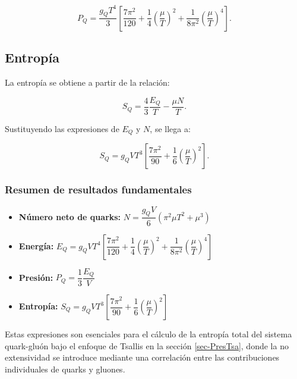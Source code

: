 \begin{equation}
P_Q = \frac{g_Q T^4}{3} \left[ \frac{7\pi^2}{120} + \frac{1}{4} \left( \frac{\mu}{T} \right)^2 + \frac{1}{8\pi^2} \left( \frac{\mu}{T} \right)^4 \right].
\end{equation}


\subsection{Entropía}

La entropía se obtiene a partir de la relación:

\begin{equation}
S_Q = \frac{4}{3} \frac{E_Q}{T} - \frac{\mu N}{T}.
\end{equation}

Sustituyendo las expresiones de \( E_Q \) y \( N \), se llega a:

\begin{equation}
S_Q = g_Q V T^3 \left[ \frac{7\pi^2}{90} + \frac{1}{6} \left( \frac{\mu}{T} \right)^2 \right].
\end{equation}


\subsubsection*{Resumen de resultados fundamentales}

\begin{itemize}
    \item \textbf{Número neto de quarks:} \( N = \dfrac{g_Q V}{6} \left( \pi^2 \mu T^2 + \mu^3 \right) \)
    \item \textbf{Energía:} \( E_Q = g_Q V T^4 \left[ \dfrac{7\pi^2}{120} + \dfrac{1}{4} \left( \dfrac{\mu}{T} \right)^2 + \dfrac{1}{8\pi^2} \left( \dfrac{\mu}{T} \right)^4 \right] \)
    \item \textbf{Presión:} \( P_Q = \dfrac{1}{3} \dfrac{E_Q}{V} \)
    \item \textbf{Entropía:} \( S_Q = g_Q V T^3 \left[ \dfrac{7\pi^2}{90} + \dfrac{1}{6} \left( \dfrac{\mu}{T} \right)^2 \right] \)
\end{itemize}

Estas expresiones son esenciales para el cálculo de la entropía total del sistema quark-gluón bajo el enfoque de Tsallis en la sección \ref{sec-PresTsa}, donde la no extensividad se introduce mediante una correlación entre las contribuciones individuales de quarks y gluones.

